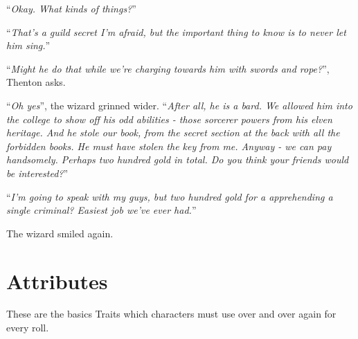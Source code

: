 \begin{multicols}{2}
{\begin{exampletext}
``\emph{Okay.
What kinds of things?}''

``\emph{That's a guild secret I'm afraid, but the important thing to know is to never let him sing.}''

``\emph{Might he do that while we're charging towards him with swords and rope?}'', Thenton asks.

``\emph{Oh yes}'', the wizard grinned wider.
``\emph{After all, he is a bard.
We allowed him into the college to show off his odd abilities - those sorcerer powers from his elven heritage.
And he stole our book, from the secret section at the back with all the forbidden books.
He must have stolen the key from me.
Anyway - we can pay handsomely.
Perhaps two hundred gold in total.
Do you think your friends would be interested?}''

``\emph{I'm going to speak with my guys, but two hundred gold for a apprehending a single criminal? Easiest job we've ever had.}''

The wizard smiled again.

\end{exampletext}
}{}

\end{multicols}

\section{Attributes}

These are the basics Traits which characters must use over and over again for every roll.

